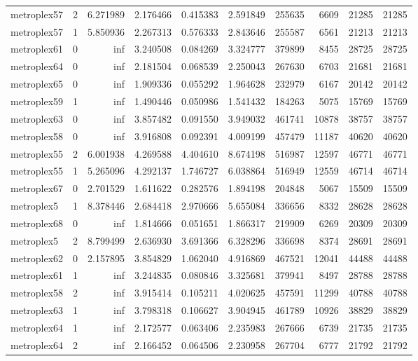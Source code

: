 \begin{longtable}{|l|r|r|r|r|r|r|r|r|r|}
metroplex57 & 2 & 6.271989 & 2.176466 & 0.415383 & 2.591849 & 255635 & 6609 & 21285 & 21285 \\
metroplex57 & 1 & 5.850936 & 2.267313 & 0.576333 & 2.843646 & 255587 & 6561 & 21213 & 21213 \\
metroplex61 & 0 & inf & 3.240508 & 0.084269 & 3.324777 & 379899 & 8455 & 28725 & 28725 \\
metroplex64 & 0 & inf & 2.181504 & 0.068539 & 2.250043 & 267630 & 6703 & 21681 & 21681 \\
metroplex65 & 0 & inf & 1.909336 & 0.055292 & 1.964628 & 232979 & 6167 & 20142 & 20142 \\
metroplex59 & 1 & inf & 1.490446 & 0.050986 & 1.541432 & 184263 & 5075 & 15769 & 15769 \\
metroplex63 & 0 & inf & 3.857482 & 0.091550 & 3.949032 & 461741 & 10878 & 38757 & 38757 \\
metroplex58 & 0 & inf & 3.916808 & 0.092391 & 4.009199 & 457479 & 11187 & 40620 & 40620 \\
metroplex55 & 2 & 6.001938 & 4.269588 & 4.404610 & 8.674198 & 516987 & 12597 & 46771 & 46771 \\
metroplex55 & 1 & 5.265096 & 4.292137 & 1.746727 & 6.038864 & 516949 & 12559 & 46714 & 46714 \\
metroplex67 & 0 & 2.701529 & 1.611622 & 0.282576 & 1.894198 & 204848 & 5067 & 15509 & 15509 \\
metroplex5 & 1 & 8.378446 & 2.684418 & 2.970666 & 5.655084 & 336656 & 8332 & 28628 & 28628 \\
metroplex68 & 0 & inf & 1.814666 & 0.051651 & 1.866317 & 219909 & 6269 & 20309 & 20309 \\
metroplex5 & 2 & 8.799499 & 2.636930 & 3.691366 & 6.328296 & 336698 & 8374 & 28691 & 28691 \\
metroplex62 & 0 & 2.157895 & 3.854829 & 1.062040 & 4.916869 & 467521 & 12041 & 44488 & 44488 \\
metroplex61 & 1 & inf & 3.244835 & 0.080846 & 3.325681 & 379941 & 8497 & 28788 & 28788 \\
metroplex58 & 2 & inf & 3.915414 & 0.105211 & 4.020625 & 457591 & 11299 & 40788 & 40788 \\
metroplex63 & 1 & inf & 3.798318 & 0.106627 & 3.904945 & 461789 & 10926 & 38829 & 38829 \\
metroplex64 & 1 & inf & 2.172577 & 0.063406 & 2.235983 & 267666 & 6739 & 21735 & 21735 \\
metroplex64 & 2 & inf & 2.166452 & 0.064506 & 2.230958 & 267704 & 6777 & 21792 & 21792 \\

\end{longtable}
